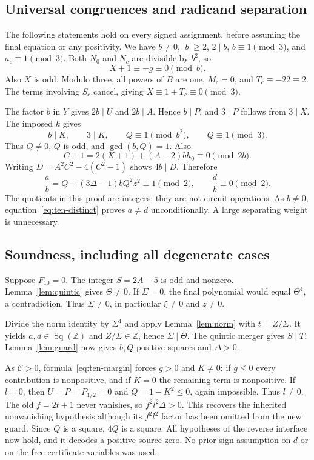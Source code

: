 \documentclass[11pt,a4paper]{article}
\theoremstyle{definition}\newtheorem{definition}[theorem]{Definition}
\theoremstyle{remark}\newtheorem{remark}[theorem]{Remark}
\newcommand{\Z}{\mathbb Z}\newcommand{\N}{\mathbb N}\newcommand{\Pos}{\mathbb Z_{>0}}
\newcommand{\Sq}{\operatorname{Sq}(\Z)}\newcommand{\Con}{\operatorname{Con}}
\begin{document}
\subsection{Universal congruences and radicand separation}

The following statements hold on every signed assignment, before
assuming the final equation or any positivity. We have $b\ne0$,
$|b|\ge2$, $2\mid b$, $b\equiv1\pmod3$, and $a_c\equiv1\pmod3$.
Both $N_0$ and $N_c$ are divisible by $b^2$, so
\[
 X+1\equiv-g\equiv0\pmod b.
\]
Also $X$ is odd. Modulo three, all powers of $B$ are one, $M_c=0$, and
$T_c\equiv-22\equiv2$. The terms involving $S_c$ cancel, giving
$X\equiv1+T_c\equiv0\pmod3$.

The factor $b$ in $Y$ gives $2b\mid U$ and $2b\mid A$. Hence $b\mid P$,
and $3\mid P$ follows from $3\mid X$. The imposed $k$ gives
\[
 b\mid K,\qquad3\mid K,\qquad
 Q\equiv1\pmod{b^2},\qquad Q\equiv1\pmod3.
\]
Thus $Q\ne0$, $Q$ is odd, and $\gcd(b,Q)=1$. Also
\[
 C+1=2(X+1)+(A-2)bh_0\equiv0\pmod{2b}.
\]
Writing $D=A^2C^2-4(C^2-1)$ shows $4b\mid D$. Therefore
\begin{equation}\label{eq:ten-distinct}
 \frac ab=Q+(3\Delta-1)bQ^2z^2\equiv1\pmod2,
 \qquad \frac db\equiv0\pmod2.
\end{equation}
The quotients in this proof are integers; they are not circuit operations.
As $b\ne0$, equation~\eqref{eq:ten-distinct} proves $a\ne d$
unconditionally. A large separating weight is unnecessary.

\subsection{Soundness, including all degenerate cases}

Suppose $F_{10}=0$. The integer $S=2A-5$ is odd and nonzero.
Lemma~\ref{lem:quintic} gives $\Theta\ne0$. If $\Sigma=0$, the final
polynomial would equal $\Theta^4$, a contradiction. Thus
$\Sigma\ne0$, in particular $\xi\ne0$ and $z\ne0$.

Divide the norm identity by $\Sigma^4$ and apply
Lemma~\ref{lem:norm} with $t=Z/\Sigma$. It yields $a,d\in\Sq$ and
$Z/\Sigma\in\Z$, hence $\Sigma\mid\Theta$. The quintic merger gives
$S\mid T$. Lemma~\ref{lem:guard} now gives $b,Q$ positive squares and
$\Delta>0$.

As $\mathscr C>0$, formula~\eqref{eq:ten-margin} forces $g>0$ and $K\ne0$:
if $g\le0$ every contribution is nonpositive, and if $K=0$ the remaining
term is nonpositive. If $l=0$, then $U=P=P_{1/2}=0$ and
$Q=1-K^2\le0$, again impossible. Thus $l\ne0$.
The old $f=2t+1$ never vanishes, so $f^2l^2\Delta>0$.
This recovers the inherited nonvanishing hypothesis although its
$f^2l^2$ factor has been omitted from the new guard. Since $Q$ is a square,
$4Q$ is a square. All hypotheses of the reverse interface now hold,
and it decodes a positive source zero. No prior sign assumption on $d$ or
on the free certificate variables was used.
\end{document}
